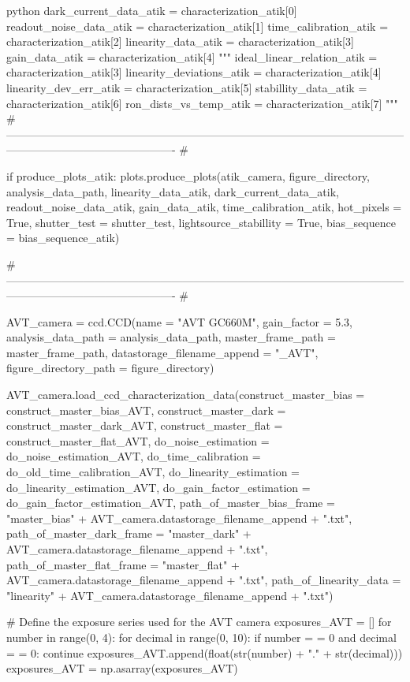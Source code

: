 \documentclass[../main.tex]{subfiles}
\begin{document}
\begin{mintedbox}{python}
dark_current_data_atik  =  characterization_atik[0]
readout_noise_data_atik  =  characterization_atik[1]
time_calibration_atik  =  characterization_atik[2]
linearity_data_atik  =  characterization_atik[3]
gain_data_atik  =  characterization_atik[4]
"""
ideal_linear_relation_atik    =    characterization_atik[3]
linearity_deviations_atik     =    characterization_atik[4]
linearity_dev_err_atik        =    characterization_atik[5]
stabillity_data_atik          =    characterization_atik[6]
ron_dists_vs_temp_atik        =    characterization_atik[7]
"""
# ---------------------------------------------------------------------------------------------------------------------------------------------------------- #

if produce_plots_atik:
plots.produce_plots(atik_camera, figure_directory, analysis_data_path, linearity_data_atik,
dark_current_data_atik, readout_noise_data_atik, gain_data_atik, time_calibration_atik,
hot_pixels  =  True, shutter_test  =  shutter_test, lightsource_stabillity  =  True,
bias_sequence  =  bias_sequence_atik)

# ---------------------------------------------------------------------------------------------------------------------------------------------------------- #

AVT_camera  =  ccd.CCD(name  =  "AVT GC660M",
gain_factor  =  5.3,
analysis_data_path  =  analysis_data_path,
master_frame_path  =  master_frame_path,
datastorage_filename_append  =  "_AVT",
figure_directory_path  =  figure_directory)

AVT_camera.load_ccd_characterization_data(construct_master_bias  =  construct_master_bias_AVT,
construct_master_dark  =  construct_master_dark_AVT,
construct_master_flat  =  construct_master_flat_AVT,
do_noise_estimation  =  do_noise_estimation_AVT,
do_time_calibration  =  do_old_time_calibration_AVT,
do_linearity_estimation  =  do_linearity_estimation_AVT,
do_gain_factor_estimation  =  do_gain_factor_estimation_AVT,
path_of_master_bias_frame  =  "master_bias" + AVT_camera.datastorage_filename_append + ".txt",
path_of_master_dark_frame  =  "master_dark" + AVT_camera.datastorage_filename_append + ".txt",
path_of_master_flat_frame  =  "master_flat" + AVT_camera.datastorage_filename_append + ".txt",
path_of_linearity_data  =  "linearity" + AVT_camera.datastorage_filename_append + ".txt")

# Define the exposure series used for the AVT camera
exposures_AVT  =  []
for number in range(0, 4):
for decimal in range(0, 10):
if number  =  =  0 and decimal  =  =  0:
continue
exposures_AVT.append(float(str(number) + "." + str(decimal)))
exposures_AVT  =  np.asarray(exposures_AVT)


\end{mintedbox}
\end{document}

